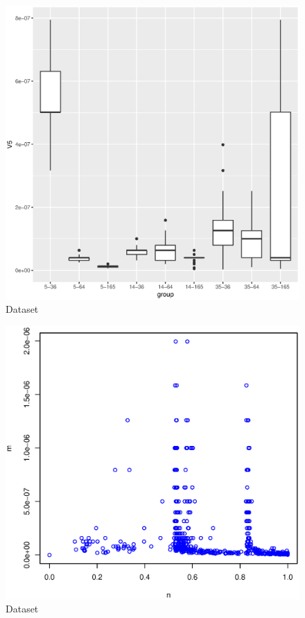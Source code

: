 \documentclass [12 pt , a4paper ] {article}
\begin{document}
\begin{figure}[!ht]
  \centering
  \includegraphics[scale=0.8]{boxplot.eps}
  \caption{Dataset}
  \label{fig:Dataset}
\end{figure}
\begin{figure}[!ht]
  \centering
  \includegraphics[scale=0.8]{rssvsn.eps}
  \caption{Dataset}
  \label{fig:Dataset}
\end{figure}
\printbibliography
\end{document}
